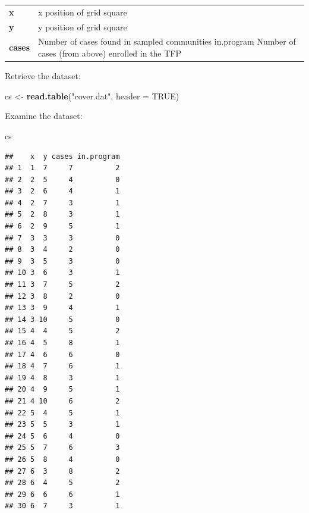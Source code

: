 \documentclass[12pt,a4paper]{book}
\newenvironment{Shaded}{\begin{snugshade}}{\end{snugshade}}
\newcommand{\DataTypeTok}[1]{\textcolor[rgb]{0.13,0.29,0.53}{#1}}
\newcommand{\KeywordTok}[1]{\textcolor[rgb]{0.13,0.29,0.53}{\textbf{#1}}}
\newcommand{\NormalTok}[1]{#1}
\newcommand{\OtherTok}[1]{\textcolor[rgb]{0.56,0.35,0.01}{#1}}
\newcommand{\StringTok}[1]{\textcolor[rgb]{0.31,0.60,0.02}{#1}}
\theoremstyle{definition}
\theoremstyle{definition}
\theoremstyle{definition}
\theoremstyle{remark}
\begin{document}
\begin{longtable}[]{@{}ll@{}}
\toprule
\endhead
\begin{minipage}[t]{0.09\columnwidth}\raggedright
\textbf{x}\strut
\end{minipage} & \begin{minipage}[t]{0.85\columnwidth}\raggedright
x position of grid square\strut
\end{minipage}\tabularnewline
\begin{minipage}[t]{0.09\columnwidth}\raggedright
\textbf{y}\strut
\end{minipage} & \begin{minipage}[t]{0.85\columnwidth}\raggedright
y position of grid square\strut
\end{minipage}\tabularnewline
\begin{minipage}[t]{0.09\columnwidth}\raggedright
\textbf{cases}\strut
\end{minipage} & \begin{minipage}[t]{0.85\columnwidth}\raggedright
Number of cases found in sampled communities in.program Number of cases
(from above) enrolled in the TFP\strut
\end{minipage}\tabularnewline
\bottomrule
\end{longtable}

Retrieve the dataset:

\begin{Shaded}
\begin{Highlighting}[]
\NormalTok{cs <-}\StringTok{ }\KeywordTok{read.table}\NormalTok{(}\StringTok{"cover.dat"}\NormalTok{, }\DataTypeTok{header =} \OtherTok{TRUE}\NormalTok{)}
\end{Highlighting}
\end{Shaded}

Examine the dataset:

\begin{Shaded}
\begin{Highlighting}[]
\NormalTok{cs}
\end{Highlighting}
\end{Shaded}

\begin{verbatim}
##    x  y cases in.program
## 1  1  7     7          2
## 2  2  5     4          0
## 3  2  6     4          1
## 4  2  7     3          1
## 5  2  8     3          1
## 6  2  9     5          1
## 7  3  3     3          0
## 8  3  4     2          0
## 9  3  5     3          0
## 10 3  6     3          1
## 11 3  7     5          2
## 12 3  8     2          0
## 13 3  9     4          1
## 14 3 10     5          0
## 15 4  4     5          2
## 16 4  5     8          1
## 17 4  6     6          0
## 18 4  7     6          1
## 19 4  8     3          1
## 20 4  9     5          1
## 21 4 10     6          2
## 22 5  4     5          1
## 23 5  5     3          1
## 24 5  6     4          0
## 25 5  7     6          3
## 26 5  8     4          0
## 27 6  3     8          2
## 28 6  4     5          2
## 29 6  6     6          1
## 30 6  7     3          1
\end{verbatim}
\end{document}
